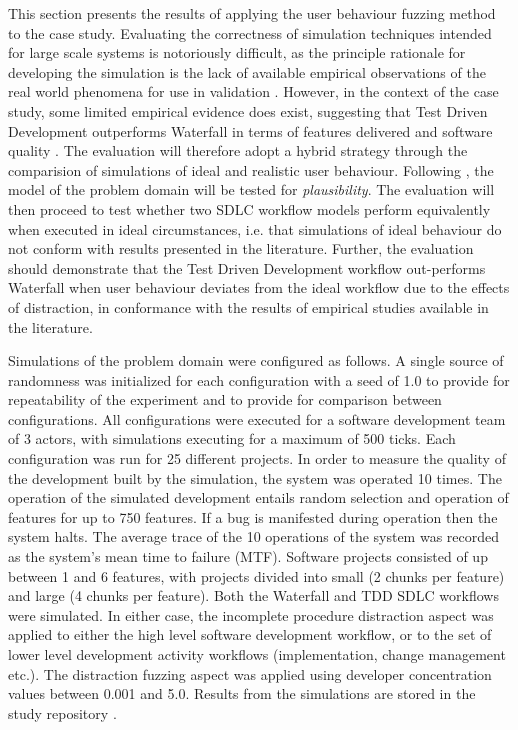 \documentclass{llncs}
\begin{document}
This section presents the results of applying the user behaviour fuzzing method to the case study.  Evaluating the
correctness of simulation techniques intended for large scale systems is notoriously difficult, as the principle
rationale for developing the simulation is the lack of available empirical observations of the real world phenomena for
use in validation \citet{naylor67verification}.  However, in the context of the case study, some limited empirical
evidence does exist, suggesting that Test Driven Development outperforms Waterfall in terms of features delivered and
software quality
\citep{Bhat2006TestDrivenDevelopment,George2004TestDrivenDevelopment,Huang2009EmpiricalTestFirstProgramming}.  The
evaluation will therefore adopt a hybrid strategy through the comparision of simulations of ideal and realistic user
behaviour. Following \citet{naylor67verification}, the model of the problem domain will be tested for
\emph{plausibility}.  The evaluation will then proceed to test whether two SDLC workflow models perform equivalently
when executed in ideal circumstances, i.e. that simulations of ideal behaviour do not conform with results presented in
the literature. Further, the evaluation should demonstrate that the Test Driven Development workflow out-performs
Waterfall when user behaviour deviates from the ideal workflow due to the effects of distraction, in conformance with
the results of empirical studies available in the literature.

Simulations of the problem domain were configured as follows.  A single source of randomness was initialized for each
configuration with a seed of 1.0 to provide for repeatability of the experiment and to provide for comparison between
configurations. All configurations were executed for a software development team of 3 actors, with simulations executing
for a maximum of 500 ticks.  Each configuration was run for 25 different projects.  In order to measure the quality of
the development built by the simulation, the system was operated 10 times.  The operation of the simulated development
entails random selection and operation of features for up to 750 features.  If a bug is manifested during operation then
the system halts.  The average trace of the 10 operations of the system was recorded as the system's mean time to
failure (MTF). Software projects consisted of up between 1 and 6 features, with projects divided into small (2 chunks
per feature) and large (4 chunks per feature). Both the Waterfall and TDD SDLC workflows were simulated.  In either
case, the incomplete procedure distraction aspect was applied to either the high level software development workflow, or
to the set of lower level development activity workflows (implementation, change management etc.).  The distraction
fuzzing aspect was applied using developer concentration values between 0.001 and 5.0.  Results from the simulations are
stored in the study repository \citep{storer2016softdev-workflow-scm}.
\end{document}
